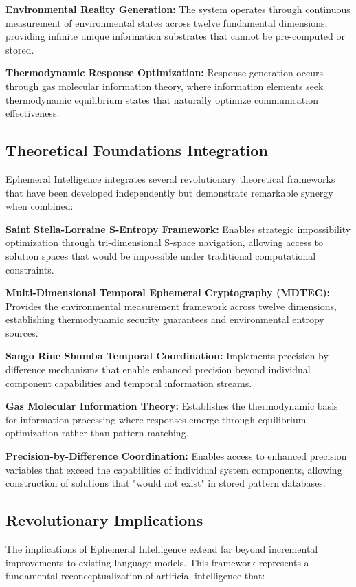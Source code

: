 \documentclass[12pt,a4paper]{article}
\begin{document}
\textbf{Environmental Reality Generation:} The system operates through continuous measurement of environmental states across twelve fundamental dimensions, providing infinite unique information substrates that cannot be pre-computed or stored.

\textbf{Thermodynamic Response Optimization:} Response generation occurs through gas molecular information theory, where information elements seek thermodynamic equilibrium states that naturally optimize communication effectiveness.

\subsection{Theoretical Foundations Integration}

Ephemeral Intelligence integrates several revolutionary theoretical frameworks that have been developed independently but demonstrate remarkable synergy when combined:

\textbf{Saint Stella-Lorraine S-Entropy Framework:} Enables strategic impossibility optimization through tri-dimensional S-space navigation, allowing access to solution spaces that would be impossible under traditional computational constraints.

\textbf{Multi-Dimensional Temporal Ephemeral Cryptography (MDTEC):} Provides the environmental measurement framework across twelve dimensions, establishing thermodynamic security guarantees and environmental entropy sources.

\textbf{Sango Rine Shumba Temporal Coordination:} Implements precision-by-difference mechanisms that enable enhanced precision beyond individual component capabilities and temporal information streams.

\textbf{Gas Molecular Information Theory:} Establishes the thermodynamic basis for information processing where responses emerge through equilibrium optimization rather than pattern matching.

\textbf{Precision-by-Difference Coordination:} Enables access to enhanced precision variables that exceed the capabilities of individual system components, allowing construction of solutions that "would not exist" in stored pattern databases.

\subsection{Revolutionary Implications}

The implications of Ephemeral Intelligence extend far beyond incremental improvements to existing language models. This framework represents a fundamental reconceptualization of artificial intelligence that:
\end{document}
